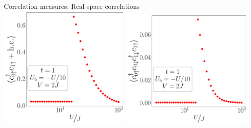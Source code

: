 \documentclass[aspectratio=169]{beamer}
\begin{document}
\begin{frame}[noframenumbering]{Correlation measures: Real-space correlations}
\vspace*{20pt}
\includegraphics[width=0.49\textwidth]{./figures/r1p-t=1.000,J=10.000,0.000,40,V=3J,Ubath=-U_by_10,N=4,U=1.000,1000.000,40.pdf}
\includegraphics[width=0.49\textwidth]{./figures/r-od-t=1.000,J=10.000,0.000,40,V=3J,Ubath=-U_by_10,N=4,U=1.000,1000.000,40.pdf}
\end{frame}
\end{document}
